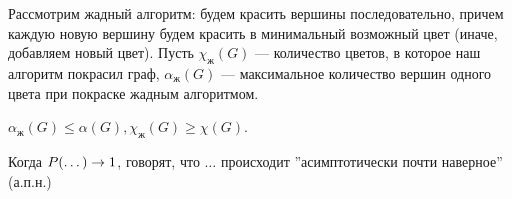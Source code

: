 Рассмотрим жадный алгоритм: будем красить вершины последовательно, причем каждую новую вершину будем красить в минимальный возможный цвет (иначе, добавляем новый цвет). Пусть \(\chi_\text{ж}(G)\) --- количество цветов, в которое наш алгоритм покрасил граф, \(\alpha_\text{ж}(G)\) --- максимальное количество вершин одного цвета при покраске жадным алгоритмом. 

\begin{note}
    \(\alpha_\text{ж}(G) \le \alpha(G), \chi_\text{ж}(G) \ge \chi(G)\).
\end{note}

\begin{note}
    Когда \(P(\dots) \rightarrow 1\), говорят, что \(\dots\) происходит ''асимптотически почти наверное'' (а.п.н.)
\end{note}

